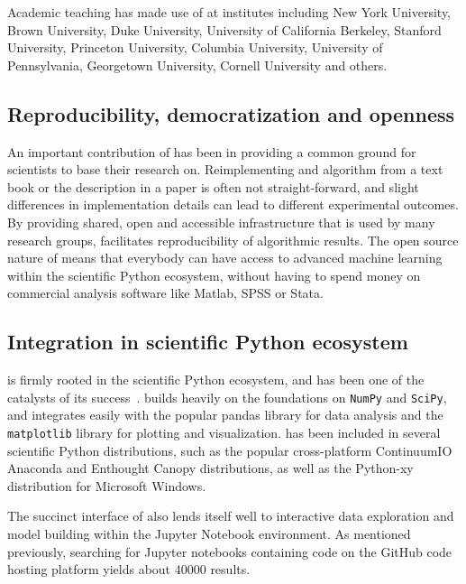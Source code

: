 Academic teaching has made use of \sklearn{} at institutes including New York
University, Brown University, Duke University, University of California
Berkeley, Stanford University, Princeton University, Columbia University,
University of Pennsylvania, Georgetown University, Cornell University and
others.

\subsection{Reproducibility, democratization and openness}
An important contribution of \sklearn{} has been in providing a common
ground for scientists to base their research on. Reimplementing
and algorithm from a text book or the description in a paper is often not
straight-forward, and slight differences in implementation details can
lead to different experimental outcomes. By providing shared, open and 
accessible infrastructure that is used by many research groups,
\sklearn{} facilitates reproducibility of algorithmic results.
The open source nature of \sklearn{} means that everybody can have access
to advanced machine learning within the scientific Python ecosystem,
without having to spend money on commercial analysis software like Matlab,
SPSS or Stata.

\subsection{Integration in scientific Python ecosystem}
\sklearn{} is firmly rooted in the scientific Python ecosystem, and has been
one of the catalysts of its success~\autocite{benlorica, infoworld}. \sklearn{}
builds heavily on the foundations on \texttt{NumPy} and \texttt{SciPy}, and
integrates easily with the popular pandas library for data analysis and the
\texttt{matplotlib} library for plotting and visualization.
\sklearn{} has been included in several scientific Python distributions, such
as the popular cross-platform ContinuumIO Anaconda and Enthought Canopy
distributions, as well as the Python-xy distribution for Microsoft Windows.

The succinct interface of \sklearn{} also lends itself well to interactive
data exploration and model building within the Jupyter Notebook environment.
As mentioned previously, searching for Jupyter notebooks containing
\sklearn{} code on the GitHub code hosting platform yields about 40000
results.

